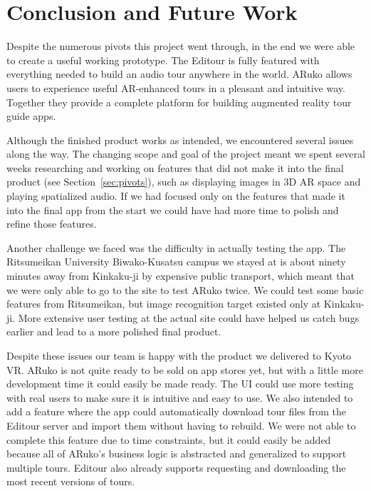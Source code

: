 \documentclass[a4paper, 10pt, american, titlepage]{article}
\begin{document}
\section{Conclusion and Future Work}
\label{sec:conclusionAndFutureWork}

Despite the numerous pivots this project went through, in the end we were able
to create a useful working prototype. The Editour is fully featured with
everything needed to build an audio tour anywhere in the world. ARuko allows
users to experience useful AR-enhanced tours in a pleasant and intuitive way.
Together they provide a complete platform for building augmented reality tour
guide apps.

Although the finished product works as intended, we encountered several issues
along the way. The changing scope and goal of the project meant we spent several
weeks researching and working on features that did not make it into the final
product (see Section~\ref{sec:pivots}), such as displaying images in 3D AR space
and playing spatialized audio. If we had focused only on the features that made
it into the final app from the start we could have had more time to polish and
refine those features.

Another challenge we faced was the difficulty in actually testing the app. The
Ritsumeikan University Biwako-Kusatsu campus we stayed at is about ninety
minutes away from Kinkaku-ji by expensive public transport, which meant that we
were only able to go to the site to test ARuko twice. We could test some basic
features from Ritsumeikan, but image recognition target existed only at
Kinkaku-ji. More extensive user testing at the actual site could have helped us
catch bugs earlier and lead to a more polished final product.

Despite these issues our team is happy with the product we delivered to Kyoto
VR. ARuko is not quite ready to be sold on app stores yet, but with a little
more development time it could easily be made ready. The UI could use more
testing with real users to make sure it is intuitive and easy to use. We also
intended to add a feature where the app could automatically download tour files
from the Editour server and import them without having to rebuild. We were not
able to complete this feature due to time constraints, but it could easily be
added because all of ARuko's business logic is abstracted and generalized to
support multiple tours. Editour also already supports requesting and downloading
the most recent versions of tours.
\end{document}

